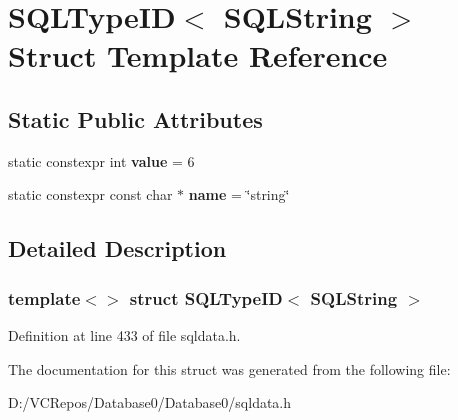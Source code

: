 \hypertarget{struct_s_q_l_type_i_d_3_01_s_q_l_string_01_4}{}\section{S\+Q\+L\+Type\+ID$<$ S\+Q\+L\+String $>$ Struct Template Reference}
\label{struct_s_q_l_type_i_d_3_01_s_q_l_string_01_4}
\subsection*{Static Public Attributes}
\begin{DoxyCompactItemize}
\item 
\mbox{\label{struct_s_q_l_type_i_d_3_01_s_q_l_string_01_4_a8f103859426e674d61d31926d487088d}} 
static constexpr int {\bfseries value} = 6
\item 
\mbox{\label{struct_s_q_l_type_i_d_3_01_s_q_l_string_01_4_a8ec92bd4d63ba231554c78c8bf118a7c}} 
static constexpr const char $\ast$ {\bfseries name} = \char`\"{}string\char`\"{}
\end{DoxyCompactItemize}


\subsection{Detailed Description}
\subsubsection*{template$<$$>$\newline
struct S\+Q\+L\+Type\+I\+D$<$ S\+Q\+L\+String $>$}



Definition at line 433 of file sqldata.\+h.



The documentation for this struct was generated from the following file\+:\begin{DoxyCompactItemize}
\item 
D\+:/\+V\+C\+Repos/\+Database0/\+Database0/sqldata.\+h\end{DoxyCompactItemize}
